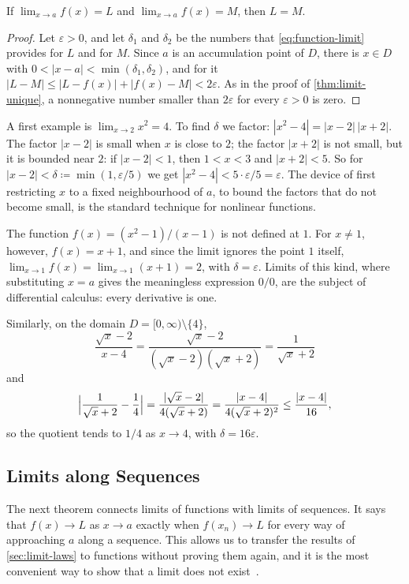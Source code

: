 \begin{proposition}
\label{prop:function-limit-unique}
If $\lim_{x\to a}f(x)=L$ and $\lim_{x\to a}f(x)=M$, then $L=M$.
\end{proposition}

\begin{proof}
Let $\varepsilon>0$, and let $\delta_1$ and $\delta_2$ be the numbers that \eqref{eq:function-limit} provides for $L$ and for $M$. Since $a$ is an accumulation point of $D$, there is $x\in D$ with $0<|x-a|<\min(\delta_1,\delta_2)$, and for it $|L-M|\le|L-f(x)|+|f(x)-M|<2\varepsilon$. As in the proof of \cref{thm:limit-unique}, a nonnegative number smaller than $2\varepsilon$ for every $\varepsilon>0$ is zero.
\end{proof}

A first example is $\lim_{x\to2}x^2=4$. To find $\delta$ we factor: $|x^2-4|=|x-2|\,|x+2|$. The factor $|x-2|$ is small when $x$ is close to $2$; the factor $|x+2|$ is not small, but it is bounded near $2$: if $|x-2|<1$, then $1<x<3$ and $|x+2|<5$. So for $|x-2|<\delta\coloneqq\min(1,\varepsilon/5)$ we get $|x^2-4|<5\cdot\varepsilon/5=\varepsilon$. The device of first restricting $x$ to a fixed neighbourhood of $a$, to bound the factors that do not become small, is the standard technique for nonlinear functions.

The function $f(x)=(x^2-1)/(x-1)$ is not defined at $1$. For $x\ne1$, however, $f(x)=x+1$, and since the limit ignores the point $1$ itself, $\lim_{x\to1}f(x)=\lim_{x\to1}(x+1)=2$, with $\delta=\varepsilon$. Limits of this kind, where substituting $x=a$ gives the meaningless expression $0/0$, are the subject of differential calculus: every derivative is one.

Similarly, on the domain $D=[0,\infty)\setminus\{4\}$,
\[
\frac{\sqrt x-2}{x-4}=\frac{\sqrt x-2}{(\sqrt x-2)(\sqrt x+2)}=\frac1{\sqrt x+2}
\]
and
\[
\Bigl|\frac1{\sqrt x+2}-\frac14\Bigr|=\frac{|\sqrt x-2|}{4(\sqrt x+2)}=\frac{|x-4|}{4(\sqrt x+2)^2}\le\frac{|x-4|}{16},
\]
so the quotient tends to $1/4$ as $x\to4$, with $\delta=16\varepsilon$.

\subsection{Limits along Sequences}

The next theorem connects limits of functions with limits of sequences. It says that $f(x)\to L$ as $x\to a$ exactly when $f(x_n)\to L$ for every way of approaching $a$ along a sequence. This allows us to transfer the results of \cref{sec:limit-laws} to functions without proving them again, and it is the most convenient way to show that a limit does not exist~\cite{abbott2015}.

